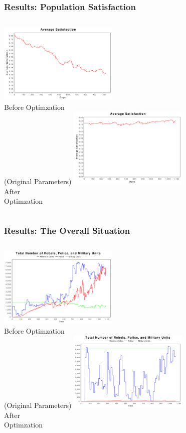\documentclass{beamer}
\begin{document}
\begin{frame}
	\frametitle{Results: Population Satisfaction}
	\begin{columns}[c]
	\column{2.5in}
		\centering
		\includegraphics[width=2.25in,keepaspectratio]{average-satisfaction-old.pdf}\\
		Before Optimzation \\(Original Parameters)
	\column{2.5in}
		\centering
		\includegraphics[width=2.25in,keepaspectratio]{average-satisfaction-new.pdf}\\
		After\\ Optimzation
	\end{columns}
\end{frame}
\begin{frame}	
	\frametitle{Results: The Overall Situation}
	\begin{columns}[c]
	\column{2.5in}
		\centering
		\includegraphics[width=2.25in,keepaspectratio]{situation-old.pdf}\\
		Before Optimzation \\(Original Parameters)
	\column{2.5in}
		\centering
		\includegraphics[width=2.25in,keepaspectratio]{situation-new.pdf}\\
		After\\ Optimzation
	\end{columns}
\end{frame}
\end{document}
